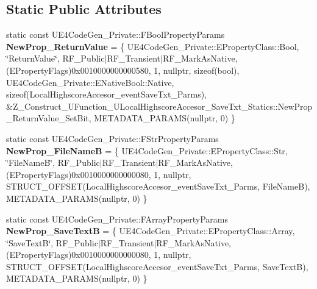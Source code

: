 \subsection*{Static Public Attributes}
\begin{DoxyCompactItemize}
\item 
\mbox{\label{struct_z___construct___u_function___u_local_highscore_accesor___save_txt___statics_aade2887de9cfb1f0cf6345b1432a44e3}} 
static const U\+E4\+Code\+Gen\+\_\+\+Private\+::\+F\+Bool\+Property\+Params {\bfseries New\+Prop\+\_\+\+Return\+Value} = \{ U\+E4\+Code\+Gen\+\_\+\+Private\+::\+E\+Property\+Class\+::\+Bool, \char`\"{}Return\+Value\char`\"{}, R\+F\+\_\+\+Public$\vert$R\+F\+\_\+\+Transient$\vert$R\+F\+\_\+\+Mark\+As\+Native, (E\+Property\+Flags)0x0010000000000580, 1, nullptr, sizeof(bool), U\+E4\+Code\+Gen\+\_\+\+Private\+::\+E\+Native\+Bool\+::\+Native, sizeof(\+Local\+Highscore\+Accesor\+\_\+event\+Save\+Txt\+\_\+\+Parms), \&\+Z\+\_\+\+Construct\+\_\+\+U\+Function\+\_\+\+U\+Local\+Highscore\+Accesor\+\_\+\+Save\+Txt\+\_\+\+Statics\+::\+New\+Prop\+\_\+\+Return\+Value\+\_\+\+Set\+Bit, M\+E\+T\+A\+D\+A\+T\+A\+\_\+\+P\+A\+R\+A\+M\+S(nullptr, 0) \}
\item 
\mbox{\label{struct_z___construct___u_function___u_local_highscore_accesor___save_txt___statics_a5d54e401edea50d6d1c5d8b05547bbde}} 
static const U\+E4\+Code\+Gen\+\_\+\+Private\+::\+F\+Str\+Property\+Params {\bfseries New\+Prop\+\_\+\+File\+NameB} = \{ U\+E4\+Code\+Gen\+\_\+\+Private\+::\+E\+Property\+Class\+::\+Str, \char`\"{}File\+NameB\char`\"{}, R\+F\+\_\+\+Public$\vert$R\+F\+\_\+\+Transient$\vert$R\+F\+\_\+\+Mark\+As\+Native, (E\+Property\+Flags)0x0010000000000080, 1, nullptr, S\+T\+R\+U\+C\+T\+\_\+\+O\+F\+F\+S\+E\+T(\+Local\+Highscore\+Accesor\+\_\+event\+Save\+Txt\+\_\+\+Parms, File\+Name\+B), M\+E\+T\+A\+D\+A\+T\+A\+\_\+\+P\+A\+R\+A\+M\+S(nullptr, 0) \}
\item 
\mbox{\label{struct_z___construct___u_function___u_local_highscore_accesor___save_txt___statics_a260f3f688714026825cc86e9e0dff98f}} 
static const U\+E4\+Code\+Gen\+\_\+\+Private\+::\+F\+Array\+Property\+Params {\bfseries New\+Prop\+\_\+\+Save\+TextB} = \{ U\+E4\+Code\+Gen\+\_\+\+Private\+::\+E\+Property\+Class\+::\+Array, \char`\"{}Save\+TextB\char`\"{}, R\+F\+\_\+\+Public$\vert$R\+F\+\_\+\+Transient$\vert$R\+F\+\_\+\+Mark\+As\+Native, (E\+Property\+Flags)0x0010000000000080, 1, nullptr, S\+T\+R\+U\+C\+T\+\_\+\+O\+F\+F\+S\+E\+T(\+Local\+Highscore\+Accesor\+\_\+event\+Save\+Txt\+\_\+\+Parms, Save\+Text\+B), M\+E\+T\+A\+D\+A\+T\+A\+\_\+\+P\+A\+R\+A\+M\+S(nullptr, 0) \}

\end{DoxyCompactItemize}
